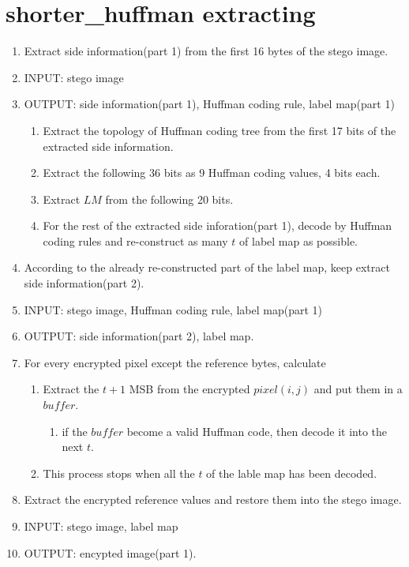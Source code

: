 \documentclass{article}
\begin{document}
\section{shorter\_huffman extracting}
\begin{enumerate}
	\item Extract side information(part 1) from the first 16 bytes of the stego image.
	\item[] INPUT: stego image
	\item[] OUTPUT: side information(part 1), Huffman coding rule, label map(part 1)
	      \begin{enumerate}
		      \item Extract the topology of Huffman coding tree from the first 17 bits of the extracted side information.
		      \item Extract the following 36 bits as 9 Huffman coding values, 4 bits each.
		      \item Extract $LM$ from the following 20 bits.
		      \item For the rest of the extracted side inforation(part 1), decode by Huffman coding rules and re-construct as many $t$ of label map as possible.
	      \end{enumerate}
	      
	\item According to the already re-constructed part of the label map, keep extract side information(part 2).
	\item[] INPUT: stego image, Huffman coding rule, label map(part 1)
	\item[] OUTPUT: side information(part 2), label map.
	\item[] For every encrypted pixel except the reference bytes, calculate
	      \begin{enumerate}
		      \item Extract the $t+1$ MSB from the encrypted $pixel(i, j)$ and put them in a $buffer$.
		            \begin{enumerate}
			            \item if the $buffer$ become a valid Huffman code, then decode it into the next $t$.
		            \end{enumerate}
		      \item This process stops when all the $t$ of the lable map has been decoded.
	      \end{enumerate}
	\item Extract the encrypted reference values and restore them into the stego image.
	\item[] INPUT: stego image, label map
	\item[] OUTPUT: encypted image(part 1).
	      

\end{enumerate}
\end{document}
